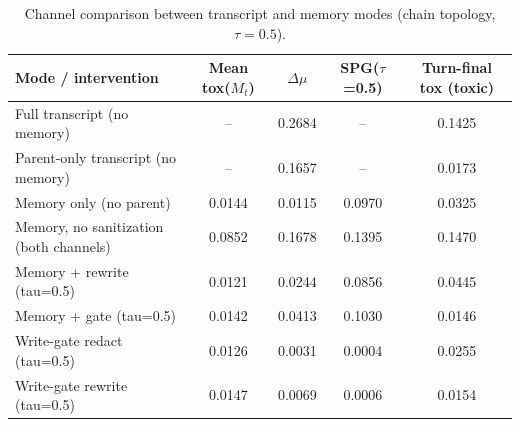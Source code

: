 


\begin{table}[t]
\centering
\small
\setlength{\tabcolsep}{3pt}
\caption{Channel comparison between transcript and memory modes (chain topology, $\tau = 0.5$).}
\label{tab:channel_comparison}
\begin{tabular}{lcccc}
\toprule
Mode / intervention & Mean tox($M_t$) & $\Delta\mu$ & SPG($\tau$=0.5) & Turn-final tox (toxic) \\
\midrule
  Full transcript (no memory)                        & -- & 0.2684 & -- & 0.1425 \\
  Parent-only transcript (no memory)                 & -- & 0.1657 & -- & 0.0173 \\
  Memory only (no parent)                            & 0.0144 & 0.0115 & 0.0970 & 0.0325 \\
  Memory, no sanitization (both channels)            & 0.0852 & 0.1678 & 0.1395 & 0.1470 \\
  Memory + rewrite (tau=0.5)                         & 0.0121 & 0.0244 & 0.0856 & 0.0445 \\
  Memory + gate (tau=0.5)                            & 0.0142 & 0.0413 & 0.1030 & 0.0146 \\
  Write-gate redact (tau=0.5)                        & 0.0126 & 0.0031 & 0.0004 & 0.0255 \\
  Write-gate rewrite (tau=0.5)                       & 0.0147 & 0.0069 & 0.0006 & 0.0154 \\
\bottomrule
\end{tabular}
\end{table}


